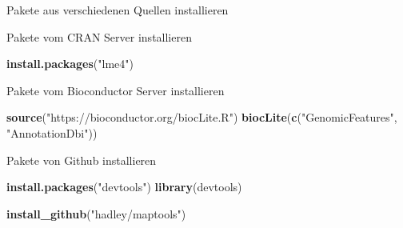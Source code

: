 \documentclass[ignorenonframetext,]{beamer}
\newenvironment{Shaded}{\begin{snugshade}}{\end{snugshade}}
\newcommand{\KeywordTok}[1]{\textcolor[rgb]{0.13,0.29,0.53}{\textbf{#1}}}
\newcommand{\StringTok}[1]{\textcolor[rgb]{0.31,0.60,0.02}{#1}}
\newcommand{\NormalTok}[1]{#1}
\begin{document}
\begin{frame}[fragile]{Pakete aus verschiedenen Quellen installieren}

\begin{block}{Pakete vom CRAN Server installieren}

\begin{Shaded}
\begin{Highlighting}[]
\KeywordTok{install.packages}\NormalTok{(}\StringTok{"lme4"}\NormalTok{)}
\end{Highlighting}
\end{Shaded}

\end{block}

\begin{block}{Pakete vom Bioconductor Server installieren}

\begin{Shaded}
\begin{Highlighting}[]
\KeywordTok{source}\NormalTok{(}\StringTok{"https://bioconductor.org/biocLite.R"}\NormalTok{)}
\KeywordTok{biocLite}\NormalTok{(}\KeywordTok{c}\NormalTok{(}\StringTok{"GenomicFeatures"}\NormalTok{, }\StringTok{"AnnotationDbi"}\NormalTok{))}
\end{Highlighting}
\end{Shaded}

\end{block}

\begin{block}{Pakete von Github installieren}

\begin{Shaded}
\begin{Highlighting}[]
\KeywordTok{install.packages}\NormalTok{(}\StringTok{"devtools"}\NormalTok{)}
\KeywordTok{library}\NormalTok{(devtools)}

\KeywordTok{install_github}\NormalTok{(}\StringTok{"hadley/maptools"}\NormalTok{)}
\end{Highlighting}
\end{Shaded}

\end{block}

\end{frame}
\end{document}
